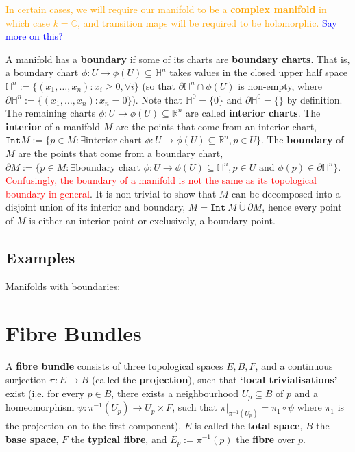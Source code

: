 \documentclass[a4paper]{article}
\theoremstyle{definition} \newtheorem*{definition}{Definition}
\theoremstyle{definition} \newtheorem*{definitions}{Definitions}
\theoremstyle{plain} \newtheorem{theorem}{Theorem}[section]
\theoremstyle{plain} \newtheorem{proposition}[theorem]{Proposition}
\theoremstyle{plain} \newtheorem{corollary}[theorem]{Corollary}
\theoremstyle{plain} \newtheorem{lemma}[theorem]{Lemma}
\theoremstyle{plain} \newtheorem{example}[theorem]{Example}
\newcommand{\checkCorrect}[1]{\textcolor{red}{#1}}
\newcommand{\understandBetter}[1]{\textcolor{orange}{#1}}
\newcommand{\explainFurther}[1]{\textcolor{blue}{#1}}
\newcommand{\defn}[1]{\textbf{#1}}
\newcommand{\realnos}{\mathbb{R}}
\newcommand{\complexnos}{\mathbb{C}}
\begin{document}
\understandBetter{In certain cases, we will require our manifold to be a \defn{complex manifold} in which case $k=\complexnos$, and transition maps will be required to be \understandBetter{holomorphic}.}
\explainFurther{Say more on this?}

A manifold has a \defn{boundary} if some of its charts are \defn{boundary charts}. That is, a boundary chart $\phi:U\to \phi(U)\subseteq \mathbb{H}^n$ takes values in the closed upper half space $\mathbb{H}^n := \{(x_1, \ldots, x_n): x_i\geq 0, \forall i\}$ (so that $\partial \mathbb{H}^n \cap \phi(U)$ is non-empty, where $\partial \mathbb{H}^n := \{(x_1, \ldots, x_n): x_n=0\}$). Note that $\mathbb{H}^0 = \{0\}$ and $\partial \mathbb{H}^0 = \{\}$ by definition. The remaining charts $\phi:U\to \phi(U)\subseteq \realnos^n$ are called \defn{interior charts}. The \defn{interior} of a manifold $M$ are the points that come from an interior chart, $\texttt{Int} M := \{p\in M: \exists \textrm{interior chart } \phi:U\to \phi(U)\subseteq \realnos^n, p\in U \}$. The \defn{boundary} of $M$ are the points that come from a boundary chart, $\partial M:=\{p\in M: \exists \textrm{boundary chart } \phi:U\to \phi(U)\subseteq \mathbb{H}^n, p\in U \textrm{ and } \phi(p)\in \partial \mathbb{H}^n \}$. \checkCorrect{Confusingly, the boundary of a manifold is not the same as its topological boundary in general}. It is non-trivial to show that $M$ can be decomposed into a disjoint union of its interior and boundary, $M = \mathtt{Int} \ M \mathbin{\dot{\cup}} \partial M$, hence every point of $M$ is either an interior point or exclusively, a boundary point.

\subsection{Examples}

Manifolds with boundaries: 

\section{Fibre Bundles}

A \defn{fibre bundle} consists of three topological spaces $E, B, F$, and a continuous surjection $\pi:E\rightarrow B$ (called the \defn{projection}), such that \defn{`local trivialisations'} exist (i.e. for every $p\in B$, there exists a neighbourhood $U_p\subseteq B$ of $p$ and a homeomorphism $\psi: \pi^{-1}(U_p) \rightarrow U_p \times F$, such that $\pi \vert_{\pi^{-1}(U_p)} = \pi_1 \circ \psi$ where $\pi_1$ is the projection on to the first component). $E$ is called the \defn{total space}, $B$ the \defn{base space}, $F$ the \defn{typical fibre}, and $E_p:=\pi^{-1}(p)$ the \defn{fibre} over $p$. 
\end{document}
